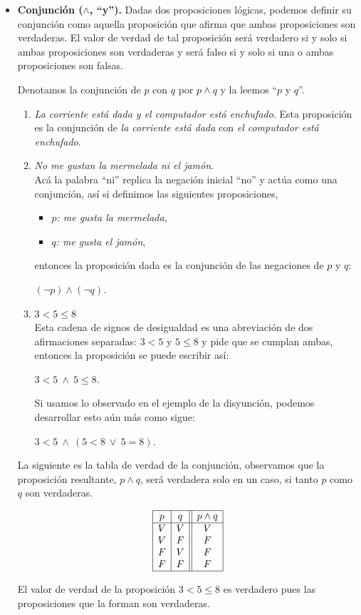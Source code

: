 \begin{itemize}
\item \textbf{ Conjunci\'on ($\land$, ``y'').} 
Dadas dos proposiciones lógicas, podemos definir su conjunción 
como aquella proposición que afirma que ambas proposiciones son verdaderas. 
El valor de verdad de tal proposición será verdadero 
si y solo si ambas proposiciones son verdaderas y 
será falso si y solo si una o ambas proposiciones son falsas.

Denotamos la conjunción de $p$ con $q$ por $p\wedge q$ y la leemos ``$p$ y $q$''.

\medskip


\begin{ejemplo}\leavevmode
\begin{enumerate}
\item {\em La corriente est\'a dada y el computador est\'a enchufado}.
Esta proposición es la conjunción de 
{\em la corriente est\'a dada} con 
{\em el computador est\'a enchufado}.

\item {\em No me gustan la mermelada ni el jamón}.\\
Acá la palabra ``ni'' replica la negación inicial ``no'' y 
actúa como una conjunción, así si definimos las siguientes proposiciones,
\begin{itemize}
\item {\em \textbf{ $p$}: me gusta la mermelada},
\item {\em \textbf{ $q$}: me gusta el jamón},
\end{itemize}

entonces la proposici\'on dada es la conjunci\'on de las negaciones de $p$ 
y $q$: 

\centerline{\em $(
\neg p)\wedge (
\neg q)$.}

\item {\em $3 < 5 \le 8$}\\
Esta cadena de signos de desigualdad es una abreviación 
de dos afirmaciones separadas: $3< 5$ y $5 \le 8$ y pide que se cumplan ambas, 
entonces la proposici\'on se puede escribir así: 

\centerline{\em $3< 5\ \wedge\ 5\le 8$.}

Si usamos lo observado en el ejemplo de la disyunción, 
podemos desarrollar esto aún más como sigue:

\centerline{\em $3< 5\ \wedge\ (5< 8\ \vee\ 5=8)$.}
\end{enumerate}
\end{ejemplo}

La siguiente es la tabla de verdad de la conjunción, observamos que la 
proposición resultante, $p\wedge q$, será verdadera solo en un caso, si tanto
$p$ como $q$ son verdaderas.

$$\begin{array}{|c|c||c|}
\hline
 p& q& p\land q \cr
\hline
V&V&V\cr
V&F&F\cr
F&V&F\cr
F&F&F\cr
\hline
\end{array}$$

El valor de verdad de la proposici\'on $3 < 5 \le 8$ es verdadero pues 
las proposiciones que la forman son verdaderas.

\end{itemize}

